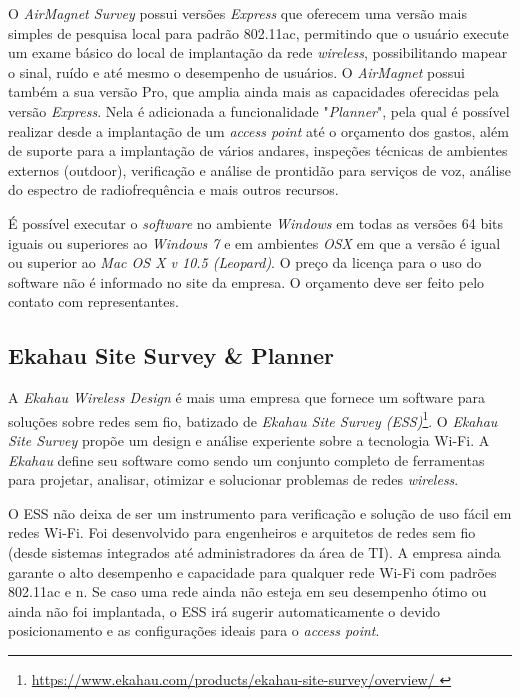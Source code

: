 \documentclass[
	12pt,				%
	openright,			%
	twoside,			%
	a4paper,			%
	english,			%
	french,				%
	spanish,			%
	brazil				%
	]{abntex2}
\begin{document}
O \textit{AirMagnet Survey} possui versões \textit{Express} que oferecem uma versão mais simples de pesquisa local para padrão 802.11ac, permitindo que o usuário execute um exame básico do local de implantação da rede \textit{wireless}, possibilitando mapear o sinal, ruído e até mesmo o desempenho de usuários. O \textit{AirMagnet} possui também a sua versão Pro, que amplia ainda mais as capacidades oferecidas pela versão \textit{Express}. Nela é adicionada a funcionalidade "\textit{Planner}", pela qual é possível realizar desde a implantação de um \textit{access point} até o orçamento dos gastos, além de suporte para a implantação de vários andares, inspeções técnicas de ambientes externos (outdoor), verificação e análise de prontidão para serviços de voz, análise do espectro de radiofrequência e mais outros recursos.

É possível executar o \textit{software} no ambiente \textit{Windows} em todas as versões 64 bits iguais ou superiores ao \textit{Windows 7} e em ambientes \textit{OSX} em que a versão é igual ou superior ao \textit{Mac OS X v 10.5 (Leopard)}. O preço da licença para o uso do software não é informado no site da empresa. O orçamento deve ser feito pelo contato com representantes.


\subsection[Ekahau Site Survey \& Planner]{Ekahau Site Survey \& Planner}

A \textit{Ekahau Wireless Design} é mais uma empresa que fornece um software para soluções sobre redes sem fio, batizado de \textit{Ekahau Site Survey (ESS)}\footnote{\url{https://www.ekahau.com/products/ekahau-site-survey/overview/ }}. O \textit{Ekahau Site Survey} propõe um design e análise experiente sobre a tecnologia Wi-Fi. A \textit{Ekahau} define seu software como sendo um conjunto completo de ferramentas para projetar, analisar, otimizar e solucionar problemas de redes \textit{wireless}.

O ESS não deixa de ser um instrumento para verificação e solução de uso fácil em redes Wi-Fi. Foi desenvolvido para engenheiros e arquitetos de redes sem fio (desde sistemas integrados até administradores da área de TI). A empresa ainda garante o alto desempenho e capacidade para qualquer rede Wi-Fi com padrões 802.11ac e n. Se caso uma rede ainda não esteja em seu desempenho ótimo ou ainda não foi implantada, o ESS irá sugerir automaticamente o devido posicionamento e as configurações ideais para o \textit{access point}.
\end{document}
